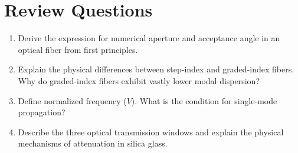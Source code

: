 \section{Review Questions}
\begin{enumerate}[leftmargin=*,itemsep=3pt]
    \item Derive the expression for numerical aperture and acceptance angle in an optical fiber from first principles.
    \item Explain the physical differences between step-index and graded-index fibers. Why do graded-index fibers exhibit vastly lower modal dispersion?
    \item Define normalized frequency ($V$). What is the condition for single-mode propagation?
    \item Describe the three optical transmission windows and explain the physical mechanisms of attenuation in silica glass.
\end{enumerate}
